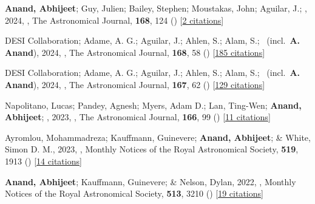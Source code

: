 \item[{\color{numcolor}\scriptsize8}] \textbf{Anand, Abhijeet}; Guy, Julien; Bailey, Stephen; Moustakas, John; Aguilar, J.; \etal, 2024, , The Astronomical Journal, \textbf{168}, 124 () [\href{https://ui.adsabs.harvard.edu/abs/2024AJ....168..124A}{2 citations}]

\item[{\color{numcolor}\scriptsize7}] DESI Collaboration; Adame, A. G.; Aguilar, J.; Ahlen, S.; Alam, S.; \etal\ (incl.\ \textbf{A. Anand}), 2024, , The Astronomical Journal, \textbf{168}, 58 () [\href{https://ui.adsabs.harvard.edu/abs/2024AJ....168...58D}{185 citations}]

\item[{\color{numcolor}\scriptsize6}] DESI Collaboration; Adame, A. G.; Aguilar, J.; Ahlen, S.; Alam, S.; \etal\ (incl.\ \textbf{A. Anand}), 2024, , The Astronomical Journal, \textbf{167}, 62 () [\href{https://ui.adsabs.harvard.edu/abs/2024AJ....167...62D}{129 citations}]

\item[{\color{numcolor}\scriptsize5}] Napolitano, Lucas; Pandey, Agnesh; Myers, Adam D.; Lan, Ting-Wen; \textbf{Anand, Abhijeet}; \etal, 2023, , The Astronomical Journal, \textbf{166}, 99 () [\href{https://ui.adsabs.harvard.edu/abs/2023AJ....166...99N}{11 citations}]

\item[{\color{numcolor}\scriptsize4}] Ayromlou, Mohammadreza; Kauffmann, Guinevere; \textbf{Anand, Abhijeet}; \& White, Simon D. M., 2023, , Monthly Notices of the Royal Astronomical Society, \textbf{519}, 1913 () [\href{https://ui.adsabs.harvard.edu/abs/2023MNRAS.519.1913A}{14 citations}]

\item[{\color{numcolor}\scriptsize3}] \textbf{Anand, Abhijeet}; Kauffmann, Guinevere; \& Nelson, Dylan, 2022, , Monthly Notices of the Royal Astronomical Society, \textbf{513}, 3210 () [\href{https://ui.adsabs.harvard.edu/abs/2022MNRAS.513.3210A}{19 citations}]

